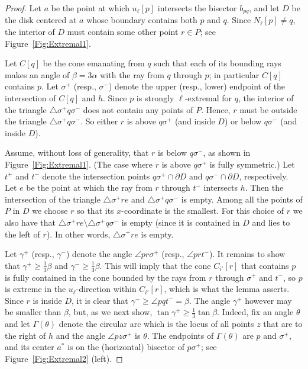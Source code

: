 \documentclass[letter,11pt]{article}
\def\bd{{\partial}}
\def\bisect{b}
\begin{document}
\begin{proof}
Let $a$ be the point at which $u_\ell[p]$ intersects the bisector
$\bisect_{pq}$, and let $D$ be the disk centered at $a$
whose boundary contains both $p$ and $q$. Since
$N_\ell[p]\neq q$, the interior of $D$ must contain some other point $r\in
P$; see Figure~\ref{Fig:Extremal1}. 

Let $C[q]$ be the cone 
emanating from $q$ such that each of its bounding rays makes an angle of
$\beta=3\alpha$ with 
the ray from $q$ through $p$;
 in particular $C[q]$ contains $p$. 
Let $\sigma^+$ (resp., $\sigma^-$) denote the upper (resp., lower) endpoint of the
intersection of  $C[q]$ and  $h$. Since $p$ is strongly $\ell$-extremal for
$q$, the interior of the triangle $\triangle \sigma^+q\sigma^-$ does not contain any
points of $P$. Hence, $r$ must be outside 
the triangle $\triangle \sigma^+q\sigma^-$. So either $r$ is above
 $q\sigma^+$ (and inside $D$) or below $q\sigma^-$ (and inside $D$).


Assume, without loss of generality, that $r$ is below $q\sigma^-$, as shown in
Figure~\ref{Fig:Extremal1}. (The case where $r$ is above
 $q\sigma^+$ is fully symmetric.) 
 Let $t^+$ and $t^-$ denote the intersection points
$q\sigma^+\cap\bd D$ and $q\sigma^-\cap\bd D$, respectively. Let $e$
be the point at which the ray 
from $r$ through $t^{-}$
intersects $h$. Then
the intersection of the triangle $\triangle \sigma^+re$ and $\triangle
\sigma^+q\sigma^-$ is empty.
Among all the points of $P$ in $D$ we choose $r$ so that its $x$-coordinate is
the smallest. For this choice of $r$ we also
have that $\triangle \sigma^+re \setminus \triangle
\sigma^+q\sigma^-$ is empty (since it is contained in $D$ and lies to the left of $r$).
In other words, $\triangle \sigma^+re$ is empty.

Let $\gamma^+$ (resp., $\gamma^-$) denote the angle $\angle pr\sigma^+$
(resp., $\angle pr t^{-}$). It remains to show that
$\gamma^+\geq \frac{1}{3}\beta$ and $\gamma^-\geq \frac{1}{3}\beta$.
This will imply that the cone $C_{i'}[r]$ that contains $p$ is fully contained in the cone bounded by the rays from $r$ through $\sigma^+$ and $t^-$, so $p$ is extreme in the $u_\ell$-direction within $C_{i'}[r]$, which is what the lemma asserts. Since $r$ is inside $D$, it is clear that
$\gamma^-\ge \angle pqt^{-}=\beta$. 
The angle
$\gamma^+$ however may be smaller than $\beta$, but, as we next show,
$\tan\gamma^+ \ge \frac13\tan \beta$.
Indeed, fix an angle $\theta$ and
let $\Gamma(\theta)$ denote the circular arc which is the locus of
all points $z$ that are to the right of $h$ and 
the angle $\angle pz\sigma^+$ is 
$\theta$. The endpoints of $\Gamma(\theta)$ are $p$ and
$\sigma^+$, and its center $a^*$ is on the (horizontal) bisector of
$p\sigma^+$; see Figure~\ref{Fig:Extremal2} (left). 


\end{proof}
\end{document}
